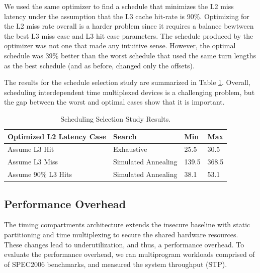 We used the same optimizer to find a schedule that minimizes the
L2 miss latency under the assumption that the L3 cache hit-rate is 90\%.
Optimizing for the L2 miss rate overall is a harder problem since it requires a 
balance bewtween the best L3 miss case and L3 hit case parameters. 
The schedule 
produced by the optimizer was not one that made any intuitive sense.  However, 
the optimal schedule was 39\% better than the worst schedule that used the 
same turn lengths as the best schedule (and as before, changed only the offsets).

The results for the schedule selection study are summarized in Table 
\ref{tab:coord_results}. Overall, scheduling interdependent time multiplexed 
devices is a challenging problem, but the gap between the worst and optimal 
cases show that it is important.

\begin{table}
    \caption{Scheduling Selection Study Results.}
    \begin{small}
    \centering
    \begin{tabular}{|l|l|l|l|}
        \hline
        \multicolumn{1}{|l|}{Optimized L2 Latency Case} & Search & Min & Max \\\hline
        \multicolumn{1}{|l|}{Assume L3 Hit} & Exhaustive & 25.5 & 30.5 
        \\\hline
        \multicolumn{1}{|l|}{Assume L3 Miss} & Simulated Annealing& 139.5 & 
        368.5 \\\hline
        \multicolumn{1}{|l|}{Assume 90\% L3 Hits} & Simulated Annealing& 38.1 & 
        53.1 \\\hline
    \end{tabular}
    \end{small}
    \label{tab:coord_results}
\end{table}

\subsection{Performance Overhead}

The timing compartments architecture extends the insecure baseline with
static partitioning and time multiplexing to secure the shared hardware 
resources. These changes lead to underutilization, and thus, a performance
overhead. To evaluate the performance overhead, we ran multiprogram workloads 
comprised of of SPEC2006 benchmarks, and measured the system throughput (STP).

